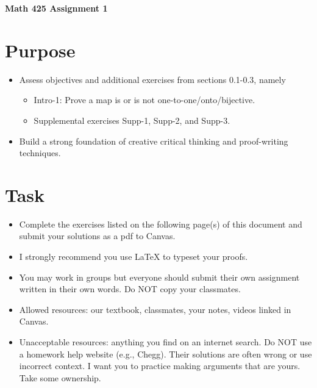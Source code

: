 \documentclass[12pt]{article}
\begin{document}
	\begin{center}
		{\Large \bf Math 425 Assignment 1}
	\end{center}
	\section*{Purpose}
		\begin{itemize}
			\item Assess objectives and additional exercises from sections 0.1-0.3, namely
				\begin{itemize}
					\item Intro-1: Prove a map is or is not one-to-one/onto/bijective.
					\item Supplemental exercises Supp-1, Supp-2, and Supp-3. 
				\end{itemize}
			\item Build a strong foundation of creative critical thinking and proof-writing techniques.
		\end{itemize}
	\section*{Task}
		\begin{itemize}
			\item Complete the exercises listed on the following page(s) of this document and submit your solutions as a pdf to Canvas.
			\item I strongly recommend you use LaTeX to typeset your proofs.
			\item You may work in groups but everyone should submit their own assignment written in their own words.  Do NOT copy your classmates.
			\item Allowed resources: our textbook, classmates, your notes, videos linked in Canvas.
			\item Unacceptable resources: anything you find on an internet search. Do NOT use a homework help website (e.g., Chegg). Their solutions are often wrong or use incorrect context.  I want you to practice making arguments that are yours. Take some ownership.
		\end{itemize}
\end{document}
